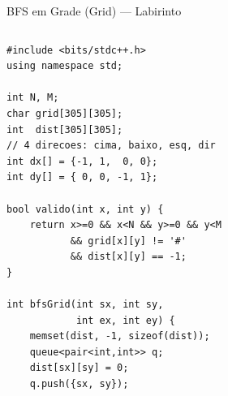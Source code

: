 \documentclass[aspectratio=169,10pt]{beamer}
\begin{document}
\begin{frame}[fragile,shrink=3]{BFS em Grade (Grid) --- Labirinto}
  \begin{columns}[t]
      \begin{tcolorbox}[caixaCodigo]
        \begin{lstlisting}[style=cppsmall]
#include <bits/stdc++.h>
using namespace std;

int N, M;
char grid[305][305];
int  dist[305][305];
// 4 direcoes: cima, baixo, esq, dir
int dx[] = {-1, 1,  0, 0};
int dy[] = { 0, 0, -1, 1};

bool valido(int x, int y) {
    return x>=0 && x<N && y>=0 && y<M
           && grid[x][y] != '#'
           && dist[x][y] == -1;
}

int bfsGrid(int sx, int sy,
            int ex, int ey) {
    memset(dist, -1, sizeof(dist));
    queue<pair<int,int>> q;
    dist[sx][sy] = 0;
    q.push({sx, sy});


\end{lstlisting}
\end{tcolorbox}
\end{columns}
\end{frame}
\end{document}
